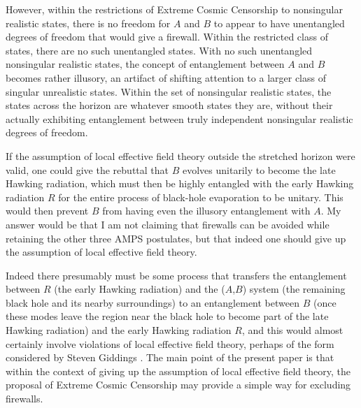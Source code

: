 \documentclass[12pt]{article}
\begin{document}
However, within the restrictions of Extreme Cosmic Censorship to nonsingular realistic states, there is no freedom for $A$ and $B$ to appear to have unentangled degrees of freedom that would give a firewall.  Within the restricted class of states, there are no such unentangled states.  With no such unentangled nonsingular realistic states, the concept of entanglement between $A$ and $B$ becomes rather illusory, an artifact of shifting attention to a larger class of singular unrealistic states.  Within the set of nonsingular realistic states, the states across the horizon are whatever smooth states they are, without their actually exhibiting entanglement between truly independent nonsingular realistic degrees of freedom.

If the assumption of local effective field theory outside the stretched horizon were valid, one could give the rebuttal that $B$ evolves unitarily to become the late Hawking radiation, which must then be highly entangled with the early Hawking radiation $R$ for the entire process of black-hole evaporation to be unitary.  This would then prevent $B$ from having even the illusory entanglement with $A$.  My answer would be that I am not claiming that firewalls can be avoided while retaining the other three AMPS postulates, but that indeed one should give up the assumption of local effective field theory.  

Indeed there presumably must be some process that
transfers the entanglement between $R$ (the early Hawking radiation) and
the ($A$,$B$) system (the remaining black hole and its nearby
surroundings) to an entanglement between $B$ (once these modes leave the
region near the black hole to become part of the late Hawking
radiation) and the early Hawking radiation $R$, and this would almost certainly involve violations of local effective field theory, perhaps of the form considered by Steven Giddings \cite{Giddings:2012gc, Giddings:2013kcj, Giddings:2013vda, Giddings:2013noa, Giddings:2014nla}.  The main point of the present paper is that within the context of giving up the assumption of local effective field theory, the proposal of Extreme Cosmic Censorship may provide a simple way for excluding firewalls.
\end{document}

